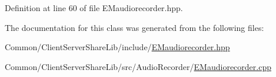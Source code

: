 Definition at line 60 of file E\+Maudiorecorder.\+hpp.



The documentation for this class was generated from the following files\+:\begin{DoxyCompactItemize}
\item 
Common/\+Client\+Server\+Share\+Lib/include/\hyperlink{_e_maudiorecorder_8hpp}{E\+Maudiorecorder.\+hpp}\item 
Common/\+Client\+Server\+Share\+Lib/src/\+Audio\+Recorder/\hyperlink{_e_maudiorecorder_8cpp}{E\+Maudiorecorder.\+cpp}\end{DoxyCompactItemize}
